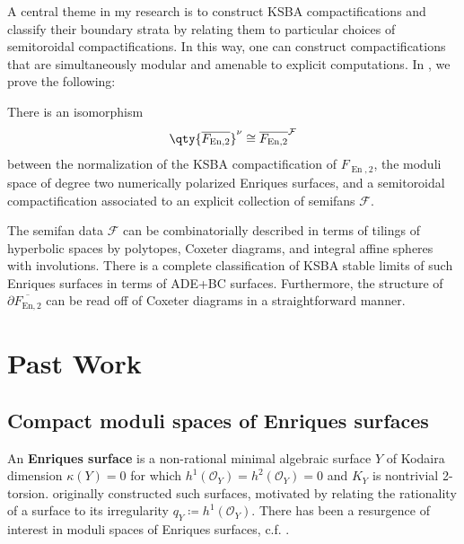 \documentclass{amsart}
\begin{document}
A central theme in my research is to construct KSBA compactifications and classify their boundary strata by relating them to particular choices of semitoroidal compactifications. In this way, one can construct compactifications that are simultaneously modular and amenable to explicit computations. In \cite{AEGS23}, we prove the following:

\begin{theorem}

\label{thm:aegs-normalization-comparison-morphism} There is an isomorphism \[
\qty{ \overline{F_{\operatorname{En}, 2}} }^\nu \cong \overline{F_{\operatorname{En}, 2}}^{{\mathcal{F}}}
\] between the normalization of the KSBA compactification of \(F_{\operatorname{En}, 2}\), the moduli space of degree two numerically polarized Enriques surfaces, and a semitoroidal compactification associated to an explicit collection of semifans \({\mathcal{F}}\).

The semifan data \({\mathcal{F}}\) can be combinatorially described in terms of tilings of hyperbolic spaces by polytopes, Coxeter diagrams, and integral affine spheres with involutions. There is a complete classification of KSBA stable limits of such Enriques surfaces in terms of ADE+BC surfaces. Furthermore, the structure of \(\partial \overline{F_{\mathrm{En}, 2}}\) can be read off of Coxeter diagrams in a straightforward manner.

\end{theorem}

\section{Past Work}\label{past-work}

\subsection{Compact moduli spaces of Enriques surfaces}\label{compact-moduli-spaces-of-enriques-surfaces}

An \textbf{Enriques surface} is a non-rational minimal algebraic surface \(Y\) of Kodaira dimension \(\kappa(Y) = 0\) for which \(h^1({\mathcal{O}}_Y) = h^2({\mathcal{O}}_Y) = 0\) and \(K_Y\) is nontrivial 2-torsion. \cite{Enr06} originally constructed such surfaces, motivated by relating the rationality of a surface to its irregularity \(q_Y \coloneqq h^1({\mathcal{O}}_Y)\). There has been a resurgence of interest in moduli spaces of Enriques surfaces, c.f. \cite{viehweg1995quasi-projective-moduli,Lie13,GH16,CDGK18,knutsen2020moduli,EnriquesOne,fortuna2020cohomology}.
\end{document}
